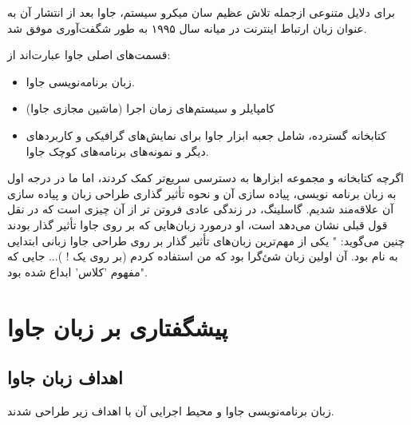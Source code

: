 \documentclass[a4paper,12pt]{report}
\begin{document}
	برای دلایل متنوعی ازجمله تلاش عظیم سان میکرو سیستم، ‌جاوا بعد از انتشار آن به عنوان زبان ارتباط اینترنت در میانه سال ۱۹۹۵ به طور شگفت‌آوری موفق شد.
	
	قسمت‌های اصلی جاوا عبارت‌اند از:
	
	\begin{itemize}[nosep]
		\renewcommand{\labelitemi}{\color{gray}\scriptsize$\blacksquare$}
		\item 
		زبان برنامه‌نویسی جاوا.
		\item
			کامپایلر و سیستم‌های زمان اجرا (ماشین مجازی جاوا)
		\item
		کتابخانه گسترده، شامل جعبه ابزار جاوا برای نمایش‌های گرافیکی و کاربرد‌های دیگر و نمونه‌های برنامه‌های کوچک جاوا.
	\end{itemize}

		اگرچه کتابخانه و مجموعه ابزارها به دسترسی سریع‌تر کمک کردند،‌ اما ما در درجه اول به زبان برنامه نویسی، پیاده سازی آن و نحوه تأثیر گذاری طراحی زبان و پیاده سازی آن علاقه‌مند شدیم.
	گاسلینگ،‌ در زندگی عادی فروتن تر از آن چیزی است که در نقل قول قبلی نشان می‌دهد است، او درمورد زبان‌هایی که بر روی جاوا تأثیر گذار بودند چنین می‌گوید: " یکی از مهم‌ترین زبان‌های تأثیر گذار بر روی طراحی جاوا زبانی ابتدایی به نام 
	\textit{}
	بود. آن اولین زبان شئ‌گرا بود که من استفاده کردم (بر روی یک 
	!
	)... جایی که مفهوم 'کلاس' ابداع شده بود".
	
	\section{پیشگفتاری بر زبان جاوا}\label{sec1:chap13}
	\subsection{اهداف زبان جاوا}\label{subsec1:sec1:chap13}
	
	زبان برنامه‌نویسی جاوا و محیط اجرایی آن با اهداف زیر طراحی شدند.
	
\end{document}

